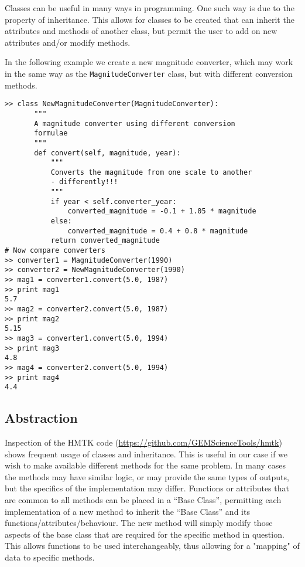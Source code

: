 Classes can be useful in many ways in programming. One such way is due to the property of inheritance. This allows for classes to be created that can inherit the attributes and methods of another class, but permit the user to add on new attributes and/or modify methods. 

In the following example we create a new magnitude converter, which may work in the same way as the \verb=MagnitudeConverter= class, but with different conversion methods.

\begin{lstlisting}[frame=single]
>> class NewMagnitudeConverter(MagnitudeConverter):
       """
       A magnitude converter using different conversion
       formulae
       """
       def convert(self, magnitude, year):
           """
           Converts the magnitude from one scale to another
           - differently!!!
           """
           if year < self.converter_year:
               converted_magnitude = -0.1 + 1.05 * magnitude
           else:
               converted_magnitude = 0.4 + 0.8 * magnitude
           return converted_magnitude
# Now compare converters
>> converter1 = MagnitudeConverter(1990)
>> converter2 = NewMagnitudeConverter(1990)
>> mag1 = converter1.convert(5.0, 1987)
>> print mag1
5.7
>> mag2 = converter2.convert(5.0, 1987)
>> print mag2
5.15
>> mag3 = converter1.convert(5.0, 1994)
>> print mag3
4.8
>> mag4 = converter2.convert(5.0, 1994)
>> print mag4
4.4    
\end{lstlisting}

\subsection{Abstraction}

Inspection of the HMTK code (\href{https://github.com/GEMScienceTools/hmtk}{https://github.com/GEMScienceTools/hmtk}) shows frequent usage of classes and inheritance. This is useful in our case if we wish to make available different methods for the same problem. In many cases the methods may have similar logic, or may provide the same types of outputs, but the specifics of the implementation may differ. Functions or attributes that are common to all methods can be placed in a ``Base Class'', permitting each implementation of a new method to inherit the ``Base Class'' and its functions/attributes/behaviour. The new method will simply modify those aspects of the base class that are required for the specific method in question. This allows functions to be used interchangeably, thus allowing for a "mapping" of data to specific methods. 

